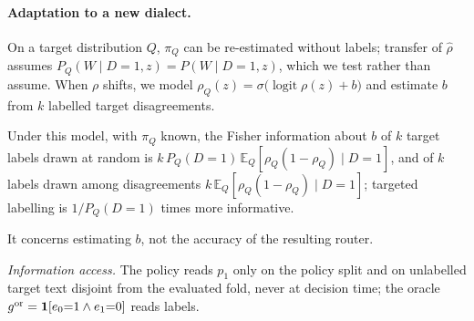 \paragraph{Adaptation to a new dialect.}
On a target distribution $Q$, $\pi_Q$ can be re-estimated without labels; transfer of $\hat\rho$ assumes $P_Q(W\mid D{=}1,z)=P(W\mid D{=}1,z)$, which we test rather than assume. When $\rho$ shifts, we model $\rho_Q(z)=\sigma\big(\operatorname{logit}\rho(z)+b\big)$ and estimate $b$ from $k$ labelled target disagreements.

\begin{proposition}
\label{prop:efficiency}
Under this model, with $\pi_Q$ known, the Fisher information about $b$ of $k$ target labels drawn at random is $k\,P_Q(D{=}1)\,\mathbb E_Q[\rho_Q(1-\rho_Q)\mid D{=}1]$, and of $k$ labels drawn among disagreements $k\,\mathbb E_Q[\rho_Q(1-\rho_Q)\mid D{=}1]$; targeted labelling is $1/P_Q(D{=}1)$ times more informative.
\end{proposition}
It concerns estimating $b$, not the accuracy of the resulting router.

\emph{Information access.} The policy reads $p_1$ only on the policy split and on unlabelled target text disjoint from the evaluated fold, never at decision time; the oracle $g^{\rm or}=\mathbf 1[e_0{=}1\wedge e_1{=}0]$ reads labels.
